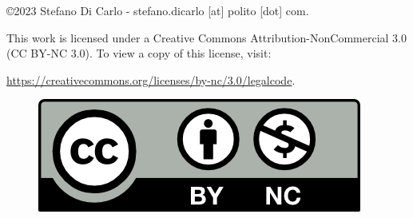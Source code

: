 \documentclass[11pt]{article}
\begin{document}


\newpage



\vfill

\begin{flushright}
    \copyright  2023 Stefano Di Carlo - stefano.dicarlo [at] polito [dot] com.

    This work is licensed under a Creative Commons Attribution-NonCommercial 3.0 (CC BY-NC 3.0).
    To view a copy of this license, visit:
 
    \url{https://creativecommons.org/licenses/by-nc/3.0/legalcode}.
\end{flushright}

\begin{figure}[h]
    \begin{flushright}    
        \includegraphics{images/by-nc.png}
        \label{fig:by-nc}
    \end{flushright}
\end{figure}
\end{document}
